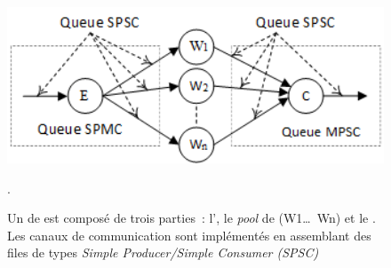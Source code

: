 \begin{figure}[ht]
\centering
     \includegraphics[width=1.0\textwidth]{Figures/FastFlowFarm.png}
      \caption{Un  de  est compos\'e de trois parties~:  l', le \emph{pool} de  (W1\ldots\ Wn) et le . Les canaux de communication sont impl\'ement\'es en assemblant des files de types \emph{Simple Producer/Simple Consumer (SPSC)} }.
       \label{FastFlowFarm.fig}
\end{figure}
